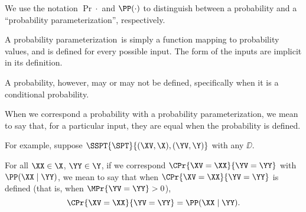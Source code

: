 \begin{note}
  \def\paramprob{probability parameterization}
  We use the notation $\Pr{\cdot}$ and $\PP(\cdot)$ to 
  distinguish between a probability and a ``\paramprob'',
  respectively.

  A \paramprob\ is simply a function mapping 
  to probability values, and is defined for every possible input.
  The form of the inputs are implicit in its definition.

  A probability, however, may or may not be defined, specifically
  when it is a conditional probability.

  When we correspond a probability with a \paramprob,
  we mean to say that, for a particular input, 
  they are equal when the probability is defined.

  For example, suppose $\SSPT{\SPT}{(\XV,\X),(\YV,\Y)}$ with any $\DD$.

  For all $\XX \in \X$, $\YY \in \Y$,
  if we correspond $\CPr{\XV = \XX}{\YV = \YY}$ with $\PP(\XX \mid \YY)$,
  we mean to say that when $\CPr{\XV = \XX}{\YV = \YY}$ is defined (that is, when $\MPr{\YV = \YY} > 0$),
  $$\CPr{\XV = \XX}{\YV = \YY} = \PP(\XX \mid \YY).$$%
\end{note}
